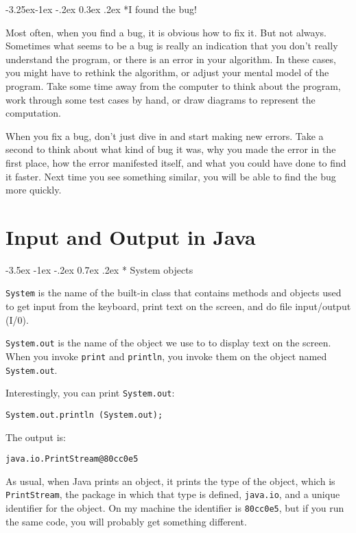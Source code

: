 \documentclass{book}
\makeatletter
\newcounter{exercisenum}
\renewcommand{\section}{\@startsection 
    {section} {1} {0mm}%
    {-3.5ex \@plus -1ex \@minus -.2ex}%
    {0.7ex \@plus.2ex}%
    {\normalfont\Large\bfseries}}
\renewcommand\subsection{\@startsection {subsection}{2}{0mm}%
    {-3.25ex\@plus -1ex \@minus -.2ex}%
    {0.3ex \@plus .2ex}%
    {\normalfont\large\bfseries}}
\newcommand{\clearemptydoublepage}{\newpage{\pagestyle{empty}\cleardoublepage}}
\newcommand{\beforechapter}{
    \cleardoublepage 
    \setcounter{exercisenum}{0}
}
\makeatother
\begin{document}
\subsection*{I found the bug!}

Most often, when you find a bug, it is obvious how to fix it.  But not
always.  Sometimes what seems to be a bug is really an indication that
you don't really understand the program, or there is an error in your
algorithm.  In these cases, you might have to rethink the algorithm,
or adjust your mental model of the program.  Take some time away from
the computer to think about the program, work through some test cases
by hand, or draw diagrams to represent the computation.

When you fix a bug, don't just dive in and start making new errors.
Take a second to think about what kind of bug it was, why you made
the error in the first place, how the error manifested itself, and
what you could have done to find it faster.  Next time you see something
similar, you will be able to find the bug more quickly.



\beforechapter
\chapter{Input and Output in Java}
\label{javaio}

\section* {System objects}
\label{system}

{\tt System} is the name of the built-in class that contains
methods and objects used to get input from the keyboard,
print text on the screen, and do file input/output (I/0).

{\tt System.out} is the name of the object we use to to display text
on the screen.  When you invoke {\tt print} and {\tt println}, you
invoke them on the object named {\tt System.out}.

Interestingly, you can print {\tt System.out}:

\begin{verbatim}
System.out.println (System.out);
\end{verbatim}
%
The output is:

\begin{verbatim}
java.io.PrintStream@80cc0e5
\end{verbatim}
%
As usual, when Java prints an object, it prints the type
of the object, which is {\tt PrintStream}, the package
in which that type is defined, {\tt java.io}, and a
unique identifier for the object.  On my machine the identifier
is {\tt 80cc0e5}, but if you run the same code, you will
probably get something different.
\end{document}
